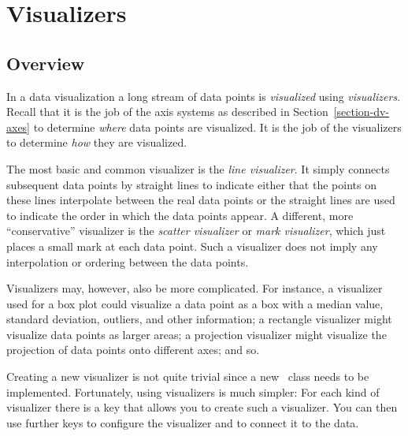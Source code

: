 %
%
%


\section{Visualizers}
\label{section-dv-visualizers}

\subsection{Overview}

In a data visualization a long stream of data points is \emph{visualized} using
\emph{visualizers}. Recall that it is the job of the axis systems as described
in Section~\ref{section-dv-axes} to determine \emph{where} data points are
visualized. It is the job of the visualizers to determine \emph{how} they are
visualized.

The most basic and common visualizer is the \emph{line visualizer}. It simply
connects subsequent data points by straight lines to indicate either that the
points on these lines interpolate between the real data points or the straight
lines are used to indicate the order in which the data points appear. A
different, more ``conservative'' visualizer is the \emph{scatter visualizer} or
\emph{mark visualizer}, which just places a small mark at each data point. Such
a visualizer does not imply any interpolation or ordering between the data
points.

Visualizers may, however, also be more complicated. For instance, a visualizer
used for a box plot could visualize a data point as a box with a median value,
standard deviation, outliers, and other information; a rectangle visualizer
might visualize data points as larger areas; a projection visualizer might
visualize the projection of data points onto different axes; and so.

Creating a new visualizer is not quite trivial since a new \pgfname\ class
needs to be implemented. Fortunately, using visualizers is much simpler: For
each kind of visualizer there is a key that allows you to create such a
visualizer. You can then use further keys to configure the visualizer and to
connect it to the data.

